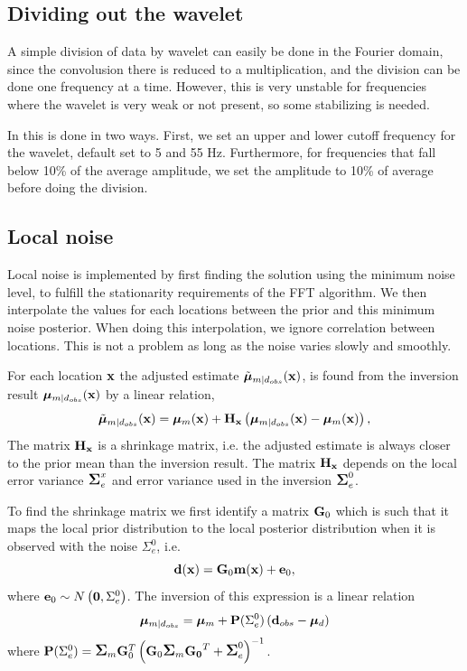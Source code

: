 \subsection{Dividing out the wavelet}
\label{sec:divwavimp}
A simple division of data by wavelet can easily be done in the Fourier domain, since the convolusion there is reduced to a multiplication, and the division can be done one frequency at a time. However, this is very unstable for frequencies where the wavelet is very weak or not present, so some stabilizing is needed.

In \crava this is done in two ways. First, we set an upper and lower cutoff frequency for the wavelet, default set to 5 and 55 Hz. Furthermore, for frequencies that fall below 10\% of the average amplitude, we set the amplitude to 10\% of average before doing the division.

\subsection{Local noise}
\label{sec:localnoiseimp}
Local noise is implemented by first finding the solution using the minimum noise level, to fulfill the stationarity requirements of the FFT algorithm. We then interpolate the values for each locations between the prior and this minimum noise posterior. When doing this interpolation, we ignore correlation between locations. This is not a problem as long as the noise varies slowly and smoothly.


For each location $\mathbf{x}$ the adjusted estimate $\tilde{\bm\mu}_{m|d_{obs}}(\mathbf{x})$, is found
from the inversion result $\bm\mu_{m|d_{obs}}(\mathbf{x})$ by a linear relation,
\begin{equation} \label{eq:LocalAdjustment}
\tilde{\bm\mu}_{m|d_{obs}}(\mathbf{x}) = \bm\mu_{m}(\mathbf{x}) +\mathbf{H_x}\left(\bm\mu_{m|d_{obs}}(\mathbf{x})-\bm\mu_{m}(\mathbf{x})\right),
\end{equation}
The matrix $\mathbf{H_x}$ is a shrinkage matrix, i.e. the adjusted estimate
is always closer to the prior mean than the inversion result. The matrix
$\mathbf{H_x}$ depends on the local error variance
 $\mbox{\large\ensuremath{\boldsymbol{\Sigma}}}_{e}^x$ and error variance used in the inversion $\mbox{\large\ensuremath{\boldsymbol{\Sigma}}}_{e}^0$.

To find the shrinkage matrix we first identify a matrix $\mathbf{G}_0$
which is such that it maps the local prior distribution to the local posterior distribution
when it is observed with the noise $\Sigma_{e}^0$, i.e.
$$ \mathbf{d}(\mathbf{x}) = \mathbf{G}_0\mathbf{m}(\mathbf{x})+\mathbf{e}_0,$$
where $\mathbf{e}_0\sim N\left( \mathbf{0},\Sigma_{e}^0\right)$.
The inversion of this expression is a linear relation
 \begin{equation} \label{eq:PSigmae}
\bm\mu_{m|d_{obs}} =\bm\mu_{m} +\mathbf{P}(\Sigma_{e}^0)\left(\mathbf{d}_{obs}-\bm\mu_{d}\right)
\end{equation}
where  $\mathbf{P}(\Sigma_{e}^0)=\mbox{\large\ensuremath{\boldsymbol{\Sigma}}}_{m}\mathbf{G}_0^T \left( \mathbf{G}_0\mbox{\large\ensuremath{\boldsymbol{\Sigma}}}_{m}\mathbf{G_0}^T+\mbox{\large\ensuremath{\boldsymbol{\Sigma}}}_{e}^0\right)^{-1}$.

